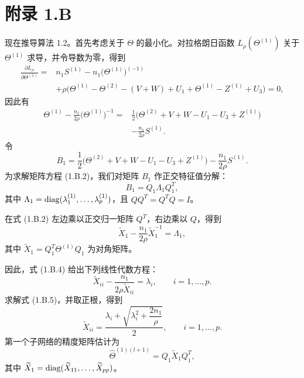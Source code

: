 \FloatBarrier
\section*{附录 1.B}

现在推导算法 1.2。首先考虑关于 $\Theta$ 的最小化。对拉格朗日函数 $L_\rho(\Theta^{(1)})$ 关于 $\Theta^{(1)}$ 求导，并令导数为零，得到
\begin{equation}
\begin{aligned}
\frac{\partial L_\rho}{\partial\Theta^{(1)}}
={}&n_1S^{(1)}-n_1\bigl(\Theta^{(1)}\bigr)^{(-1)} \\
&+\rho\bigl(\Theta^{(1)}-\Theta^{(2)}-(V+W)+U_1
+\Theta^{(1)}-Z^{(1)}+U_3\bigr)=0,
\end{aligned}
\tag{1.B.1}
\end{equation}
因此有
\begin{equation}
\begin{aligned}
\Theta^{(1)}-\frac{n_1}{2\rho}\bigl(\Theta^{(1)}\bigr)^{-1}
={}&\frac12\bigl(\Theta^{(2)}+V+W-U_1-U_3+Z^{(1)}\bigr) \\
&-\frac{n_1}{2\rho}S^{(1)}.
\end{aligned}
\tag{1.B.2}
\end{equation}
令
\[
B_1=\frac12\bigl(\Theta^{(2)}+V+W-U_1-U_3+Z^{(1)}\bigr)-\frac{n_1}{2\rho}S^{(1)}.
\]
为求解矩阵方程 (1.B.2)，我们对矩阵 $B_1$ 作正交特征值分解：
\begin{equation}
B_1=Q_1\Lambda_1Q_1^T,
\tag{1.B.3}
\end{equation}
其中 $\Lambda_1=\operatorname{diag}(\lambda_1^{(1)},\ldots,\lambda_p^{(1)})$，且 $QQ^T=Q^TQ=I$。

在式 (1.B.2) 左边乘以正交归一矩阵 $Q^T$，右边乘以 $Q$，得到
\begin{equation}
\widetilde X_1-\frac{n_1}{2\rho}\widetilde X_1^{-1}=\Lambda_1,
\tag{1.B.4}
\end{equation}
其中 $\widetilde X_1=Q_1^T\Theta^{(1)}Q_1$ 为对角矩阵。

因此，式 (1.B.4) 给出下列线性代数方程：
\begin{equation}
\widetilde X_{ii}-\frac{n_1}{2\rho\widetilde X_{ii}}=\lambda_i,
\qquad i=1,\ldots,p.
\tag{1.B.5}
\end{equation}
求解式 (1.B.5)，并取正根，得到
\[
\widetilde X_{ii}=\frac{\lambda_i+\sqrt{\lambda_i^2+\dfrac{2n_1}{\rho}}}{2},
\qquad i=1,\ldots,p.
\]
第一个子网络的精度矩阵估计为
\begin{equation}
\widehat\Theta^{(1)(l+1)}=Q_1\widetilde X_1Q_1^T,
\tag{1.B.6}
\end{equation}
其中 $\widetilde X_1=\operatorname{diag}(\widetilde X_{11},\ldots,\widetilde X_{pp})$。

